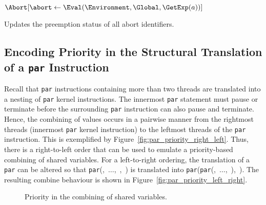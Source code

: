 \begin{algorithm}[t]
	\begin{algorithmic}[1]
		\Function{$\Preemptions$}{\Environment{}, \Abort{}}
			\ForAll {$\abort \in \Abort$}
				\State $\Abort[\abort \gets \Eval(\Environment, \Global, \GetExp(a))]$	\label{algo:Preemptions_update}
			\EndFor
			\State \Return \Abort
		\EndFunction
	\end{algorithmic}
	
	\caption{Updates the preemption status of all abort identifiers.}
	\label{algo:Preemptions}
\end{algorithm}



\subsection{Encoding Priority in the Structural Translation of a \texttt{par} Instruction}
Recall that \verb$par$ instructions containing more than two threads are translated into
a nesting of \verb$par$ kernel instructions. The innermost \verb$par$ statement must pause
or terminate before the surrounding \verb$par$ instruction can also pause and terminate.
Hence, the combining of values occurs in a pairwise manner from the rightmost threads 
(innermost \verb$par$ kernel instruction) to the leftmost threads of the \verb$par$ instruction.
This is exemplified by Figure~\ref{fig:par_priority_right_left}. Thus, there is a right-to-left 
order that can be used to emulate a priority-based combining of shared variables.
For a left-to-right ordering, the translation of a \verb$par$ can be altered so that 
\verb$par$(,~$\dots$,~,~) is translated into 
\verb$par$(\verb$par$(,~$\dots$,~),~). The resulting combine 
behaviour is shown in Figure~\ref{fig:par_priority_left_right}.

\begin{figure}
	\centering
	
	\hfill
	\hfill
	\hfill
	
	\caption{Priority in the combining of shared variables.}
	\label{fig:par_priority}
\end{figure}


